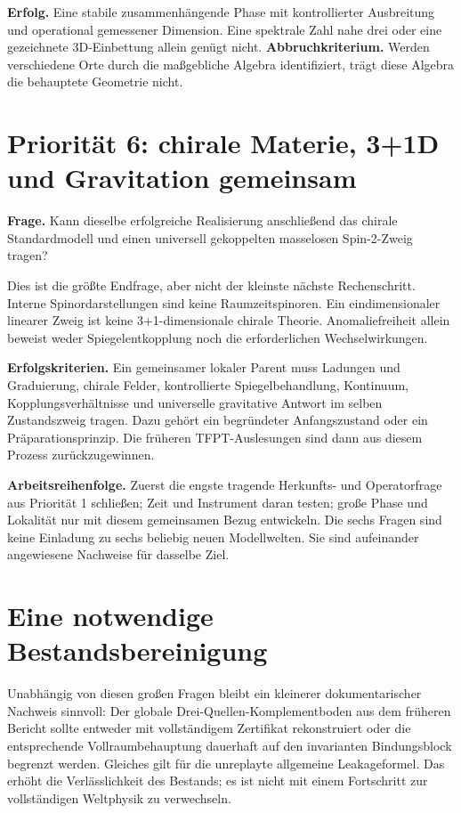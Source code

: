 \documentclass[11pt,a4paper,oneside,parskip=half,headings=normal,numbers=noenddot,bibliography=totoc]{scrreprt}
\begin{document}
\textbf{Erfolg.} Eine stabile zusammenhängende Phase mit kontrollierter Ausbreitung und operational gemessener Dimension. Eine spektrale Zahl nahe drei oder eine gezeichnete 3D-Einbettung allein genügt nicht. \textbf{Abbruchkriterium.} Werden verschiedene Orte durch die maßgebliche Algebra identifiziert, trägt diese Algebra die behauptete Geometrie nicht.

\section{Priorität 6: chirale Materie, 3+1D und Gravitation gemeinsam}
\textbf{Frage.} Kann dieselbe erfolgreiche Realisierung anschließend das chirale Standardmodell und einen universell gekoppelten masselosen Spin-2-Zweig tragen?

Dies ist die größte Endfrage, aber nicht der kleinste nächste Rechenschritt. Interne Spinordarstellungen sind keine Raumzeitspinoren. Ein eindimensionaler linearer Zweig ist keine 3+1-dimensionale chirale Theorie. Anomaliefreiheit allein beweist weder Spiegelentkopplung noch die erforderlichen Wechselwirkungen.

\textbf{Erfolgskriterien.} Ein gemeinsamer lokaler Parent muss Ladungen und Graduierung, chirale Felder, kontrollierte Spiegelbehandlung, Kontinuum, Kopplungsverhältnisse und universelle gravitative Antwort im selben Zustandszweig tragen. Dazu gehört ein begründeter Anfangszustand oder ein Präparationsprinzip. Die früheren TFPT-Auslesungen sind dann aus diesem Prozess zurückzugewinnen.

\textbf{Arbeitsreihenfolge.} Zuerst die engste tragende Herkunfts- und Operatorfrage aus Priorität 1 schließen; Zeit und Instrument daran testen; große Phase und Lokalität nur mit diesem gemeinsamen Bezug entwickeln. Die sechs Fragen sind keine Einladung zu sechs beliebig neuen Modellwelten. Sie sind aufeinander angewiesene Nachweise für dasselbe Ziel.

\section{Eine notwendige Bestandsbereinigung}
Unabhängig von diesen großen Fragen bleibt ein kleinerer dokumentarischer Nachweis sinnvoll: Der globale Drei-Quellen-Komplementboden aus dem früheren Bericht sollte entweder mit vollständigem Zertifikat rekonstruiert oder die entsprechende Vollraumbehauptung dauerhaft auf den invarianten Bindungsblock begrenzt werden. Gleiches gilt für die unreplayte allgemeine Leakageformel. Das erhöht die Verlässlichkeit des Bestands; es ist nicht mit einem Fortschritt zur vollständigen Weltphysik zu verwechseln.
\end{document}

